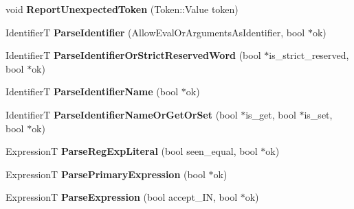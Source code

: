 \begin{DoxyCompactItemize}
\item 
\hypertarget{classv8_1_1internal_1_1_parser_base_aeeeae0f1a196da2c9e0c157521bcf8b4}{}void {\bfseries Report\+Unexpected\+Token} (Token\+::\+Value token)\label{classv8_1_1internal_1_1_parser_base_aeeeae0f1a196da2c9e0c157521bcf8b4}

\item 
\hypertarget{classv8_1_1internal_1_1_parser_base_a70b02f33924941a1ba20432620bcca22}{}Identifier\+T {\bfseries Parse\+Identifier} (Allow\+Eval\+Or\+Arguments\+As\+Identifier, bool $\ast$ok)\label{classv8_1_1internal_1_1_parser_base_a70b02f33924941a1ba20432620bcca22}

\item 
\hypertarget{classv8_1_1internal_1_1_parser_base_a28037cfa4f051e2b99f95674ca72e6cc}{}Identifier\+T {\bfseries Parse\+Identifier\+Or\+Strict\+Reserved\+Word} (bool $\ast$is\+\_\+strict\+\_\+reserved, bool $\ast$ok)\label{classv8_1_1internal_1_1_parser_base_a28037cfa4f051e2b99f95674ca72e6cc}

\item 
\hypertarget{classv8_1_1internal_1_1_parser_base_a05cc5aab526a6c429f99cdbad6c7a034}{}Identifier\+T {\bfseries Parse\+Identifier\+Name} (bool $\ast$ok)\label{classv8_1_1internal_1_1_parser_base_a05cc5aab526a6c429f99cdbad6c7a034}

\item 
\hypertarget{classv8_1_1internal_1_1_parser_base_a680b82b8e1b78190376dea67f6e23425}{}Identifier\+T {\bfseries Parse\+Identifier\+Name\+Or\+Get\+Or\+Set} (bool $\ast$is\+\_\+get, bool $\ast$is\+\_\+set, bool $\ast$ok)\label{classv8_1_1internal_1_1_parser_base_a680b82b8e1b78190376dea67f6e23425}

\item 
\hypertarget{classv8_1_1internal_1_1_parser_base_af5ed82e468be1e2355ac2beca4059474}{}Expression\+T {\bfseries Parse\+Reg\+Exp\+Literal} (bool seen\+\_\+equal, bool $\ast$ok)\label{classv8_1_1internal_1_1_parser_base_af5ed82e468be1e2355ac2beca4059474}

\item 
\hypertarget{classv8_1_1internal_1_1_parser_base_ae7681a318d40672685593c4eba0e06c3}{}Expression\+T {\bfseries Parse\+Primary\+Expression} (bool $\ast$ok)\label{classv8_1_1internal_1_1_parser_base_ae7681a318d40672685593c4eba0e06c3}

\item 
\hypertarget{classv8_1_1internal_1_1_parser_base_ac4269fba00462cc1a9f060e6b37ad311}{}Expression\+T {\bfseries Parse\+Expression} (bool accept\+\_\+\+I\+N, bool $\ast$ok)\label{classv8_1_1internal_1_1_parser_base_ac4269fba00462cc1a9f060e6b37ad311}


\end{DoxyCompactItemize}
